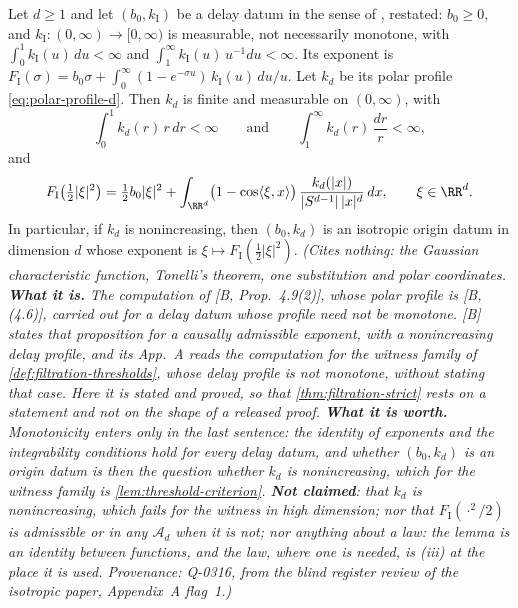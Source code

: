 \begin{lemma}
\label{lem:delay-polar-profile}
\leanok
Let $d \ge 1$ and let $(b_0, k_{\mathrm I})$ be a delay datum in the sense of ,
restated: $b_0 \ge 0$, and $k_{\mathrm I} : (0,\infty) \to [0,\infty)$ is measurable, not
necessarily monotone, with $\int_0^1 k_{\mathrm I}(u)\,du < \infty$ and
$\int_1^\infty k_{\mathrm I}(u)\,u^{-1}du < \infty$. Its exponent is
$F_{\mathrm I}(\sigma) = b_0\sigma + \int_0^\infty(1 - e^{-\sigma u})\,k_{\mathrm I}(u)\,du/u$.
Let $k_d$ be its polar profile \ref{eq:polar-profile-d}. Then $k_d$ is finite and measurable on
$(0,\infty)$, with
\[
  \int_0^1 k_d(r)\,r\,dr < \infty
  \qquad\text{and}\qquad
  \int_1^\infty k_d(r)\,\frac{dr}{r} < \infty ,
\]
and
\[
  F_{\mathrm I}\bigl(\tfrac12|\xi|^2\bigr) = \tfrac12 b_0|\xi|^2
   + \int_{\RR^d}\bigl(1 - \cos\langle\xi,x\rangle\bigr)\,\frac{k_d(|x|)}{|S^{d-1}|\,|x|^d}\,dx ,
   \qquad \xi \in \RR^d .
\]
In particular, if $k_d$ is nonincreasing, then $(b_0,k_d)$ is an isotropic origin datum in
dimension $d$ whose exponent is $\xi \mapsto F_{\mathrm I}(\tfrac12|\xi|^2)$.
\statusT\quad\emph{(Cites nothing: the Gaussian characteristic function, Tonelli's theorem, one
substitution and polar coordinates. \textbf{What it is.} The computation of [B, Prop.~4.9(2)], whose
polar profile is [B, (4.6)], carried out for a delay datum whose profile need not be monotone.
[B] states that proposition for a causally admissible exponent, with a nonincreasing delay profile,
and its App.~A reads the computation for the witness family of \ref{def:filtration-thresholds},
whose delay profile is not monotone, without stating that case. Here it is stated and proved, so
that \ref{thm:filtration-strict} rests on a statement and not on the shape of a released proof.
\textbf{What it is worth.} Monotonicity enters only in the last sentence: the identity of
exponents and the integrability conditions hold for every delay datum, and whether
$(b_0,k_d)$ is an origin datum is then the question whether $k_d$ is nonincreasing, which for the
witness family is \ref{lem:threshold-criterion}. \textbf{Not claimed}: that $k_d$ is
nonincreasing, which fails for the witness in high dimension; nor that $F_{\mathrm I}(\cdot^2/2)$ is
admissible or in any $\mathcal{A}_d$ when it is not; nor anything about a law: the lemma is an
identity between functions, and the law, where one is needed, is (iii) at the place it
is used. Provenance: Q-0316, from the blind register review of the isotropic paper, Appendix~A
flag~1.)}
\end{lemma}

